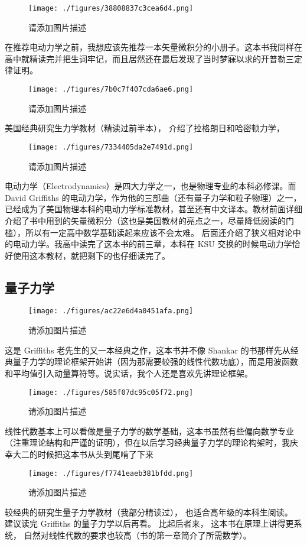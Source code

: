 \begin{figure}[ht]
\centering
\texttt{[image: ./figures/38808837c3cea6d4.png]}
\caption{请添加图片描述} \label{fig_PhText_2}
\end{figure}
在推荐电动力学之前，我想应该先推荐一本矢量微积分的小册子。这本书我同样在高中就精读完并把生词牢记，而且居然还在最后发现了当时梦寐以求的开普勒三定律证明。

\begin{figure}[ht]
\centering
\texttt{[image: ./figures/7b0c7f407cda6ae6.png]}
\caption{请添加图片描述} \label{fig_PhText_3}
\end{figure}
美国经典研究生力学教材（精读过前半本）， 介绍了拉格朗日和哈密顿力学，


\begin{figure}[ht]
\centering
\texttt{[image: ./figures/7334405da2e7491d.png]}
\caption{请添加图片描述} \label{fig_PhText_5}
\end{figure}
电动力学（Electrodynamics）是四大力学之一，也是物理专业的本科必修课。而 David Griffiths 的电动力学，作为他的三部曲（还有量子力学和粒子物理）之一，已经成为了美国物理本科的电动力学标准教材，甚至还有中文译本。教材前面详细介绍了书中用到的矢量微积分（这也是美国教材的亮点之一，尽量降低阅读的门槛），所以有一定高中数学基础读起来应该不会太难。 后面还介绍了狭义相对论中的电动力学。我高中读完了这本书的前三章，本科在 KSU 交换的时候电动力学恰好使用这本教材，就把剩下的也仔细读完了。

\subsection{量子力学}
\begin{figure}[ht]
\centering
\texttt{[image: ./figures/ac22e6d4a0451afa.png]}
\caption{请添加图片描述} \label{fig_PhText_6}
\end{figure}
这是 Griffiths 老先生的又一本经典之作，这本书并不像 Shankar 的书那样先从经典量子力学的理论框架开始讲（因为那需要较强的线性代数功底），而是用波函数和平均值引入动量算符等。说实话，我个人还是喜欢先讲理论框架。

\begin{figure}[ht]
\centering
\texttt{[image: ./figures/585f07dc95c05f72.png]}
\caption{请添加图片描述} \label{fig_PhText_7}
\end{figure}
线性代数基本上可以看做是量子力学的数学基础，这本书虽然有些偏向数学专业（注重理论结构和严谨的证明），但在以后学习经典量子力学的理论构架时，我庆幸大二的时候把这本书从头到尾啃了下来

\begin{figure}[ht]
\centering
\texttt{[image: ./figures/f7741eaeb381bfdd.png]}
\caption{请添加图片描述} \label{fig_PhText_8}
\end{figure}
较经典的研究生量子力学教材（我部分精读过）， 也适合高年级的本科生阅读。 建议读完 Griffiths 的量子力学以后再看。 比起后者来， 这本书在原理上讲得更系统， 自然对线性代数的要求也较高（书的第一章简介了所需数学）。

